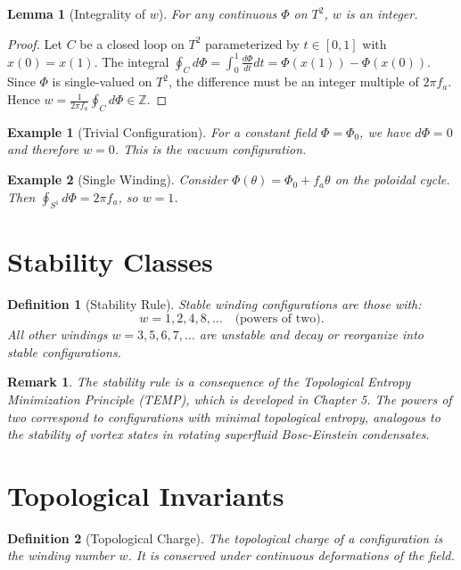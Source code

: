 \documentclass[12pt,oneside]{book}
\newtheorem{definition}{Definition}[chapter]
\newtheorem{lemma}{Lemma}[chapter]
\newtheorem{remark}{Remark}[chapter]
\newtheorem{example}{Example}[chapter]
\begin{document}
\begin{lemma}[Integrality of $w$]
For any continuous $\Phi$ on $T^2$, $w$ is an integer.
\end{lemma}

\begin{proof}
Let $C$ be a closed loop on $T^2$ parameterized by $t \in [0,1]$ with $x(0) = x(1)$. The integral $\oint_C d\Phi = \int_0^1 \frac{d\Phi}{dt} dt = \Phi(x(1)) - \Phi(x(0))$. Since $\Phi$ is single-valued on $T^2$, the difference must be an integer multiple of $2\pi f_a$. Hence $w = \frac{1}{2\pi f_a}\oint_C d\Phi \in \mathbb{Z}$.
\end{proof}

\begin{example}[Trivial Configuration]
For a constant field $\Phi = \Phi_0$, we have $d\Phi = 0$ and therefore $w = 0$. This is the vacuum configuration.
\end{example}

\begin{example}[Single Winding]
Consider $\Phi(\theta) = \Phi_0 + f_a\theta$ on the poloidal cycle. Then $\oint_{S^1} d\Phi = 2\pi f_a$, so $w = 1$.
\end{example}

\section{Stability Classes}

\begin{definition}[Stability Rule]
Stable winding configurations are those with:
\[
w = 1, 2, 4, 8, \ldots \quad \text{(powers of two)}.
\]
All other windings $w = 3, 5, 6, 7, \ldots$ are unstable and decay or reorganize into stable configurations.
\end{definition}

\begin{remark}
The stability rule is a consequence of the Topological Entropy Minimization Principle (TEMP), which is developed in Chapter 5. The powers of two correspond to configurations with minimal topological entropy, analogous to the stability of vortex states in rotating superfluid Bose-Einstein condensates.
\end{remark}

\section{Topological Invariants}

\begin{definition}[Topological Charge]
The topological charge of a configuration is the winding number $w$. It is conserved under continuous deformations of the field.
\end{definition}
\end{document}
